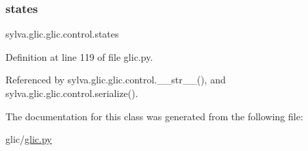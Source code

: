 \mbox{\label{classsylva_1_1glic_1_1glic_1_1control_a392a1e20052ef15fa96049f9b201be02}} 
\subsubsection{\texorpdfstring{states}{states}}
{\footnotesize\ttfamily sylva.\+glic.\+glic.\+control.\+states}



Definition at line 119 of file glic.\+py.



Referenced by sylva.\+glic.\+glic.\+control.\+\_\+\+\_\+str\+\_\+\+\_\+(), and sylva.\+glic.\+glic.\+control.\+serialize().



The documentation for this class was generated from the following file\+:\begin{DoxyCompactItemize}
\item 
glic/\hyperlink{glic_8py}{glic.\+py}\end{DoxyCompactItemize}
